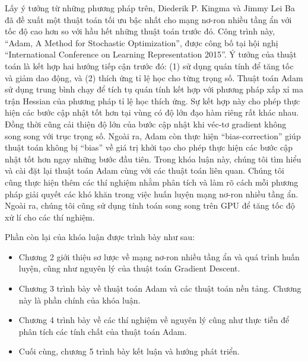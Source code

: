 Lấy ý tưởng từ những phương pháp trên, Diederik P. Kingma và Jimmy Lei Ba đã đề xuất một thuật toán tối ưu bậc nhất cho mạng nơ-ron nhiều tầng ẩn với tốc độ cao hơn so với hầu hết những thuật toán trước đó\cite{kingma2014adam}. Công trình này, ``Adam, A Method for Stochastic Optimization'', được công bố tại hội nghị ``International Conference on Learning Representation 2015''. Ý tưởng của thuật toán là kết hợp hai hướng tiếp cận trước đó: (1) sử dụng quán tính để tăng tốc và giảm dao động, và (2) thích ứng tỉ lệ học cho từng trọng số. Thuật toán Adam sử dụng trung bình chạy để tích tụ quán tính kết hợp với phương pháp xấp xỉ ma trận Hessian của phương pháp tỉ lệ học thích ứng. Sự kết hợp này cho phép thực hiện các bước cập nhật tốt hơn tại vùng có độ lớn đạo hàm riêng rất khác nhau. Đồng thời cũng cải thiện độ lớn của bước cập nhật khi véc-tơ gradient không song song với trục trọng số. Ngoài ra, Adam còn thực hiện ``bias-correction'' giúp thuật toán không bị ``bias'' về giá trị khởi tạo cho phép thực hiện các bước cập nhật tốt hơn ngay những bước đầu tiên. Trong khóa luận này, chúng tôi tìm hiểu và cài đặt lại thuật toán Adam cùng với các thuật toán liên quan. Chúng tôi cũng thực hiện thêm các thí nghiệm nhằm phân tích và làm rõ cách mỗi phương pháp giải quyết các khó khăn trong việc huấn luyện mạng nơ-ron nhiều tầng ẩn. Ngoài ra, chúng tôi cũng sử dụng tính toán song song trên GPU để tăng tốc độ xử lí cho các thí nghiệm.

Phần còn lại của khóa luận được trình bày như sau:

\begin{itemize}
	\item Chương 2 giới thiệu sơ lược về mạng nơ-ron nhiều tầng ẩn và quá trình huấn luyện, cũng như nguyên lý của thuật toán Gradient Descent.
	\item Chương 3 trình bày về thuật toán Adam và các thuật toán nền tảng. Chương này là phần chính của khóa luận.
	\item Chương 4 trình bày về các thí nghiệm về nguyên lý cũng như thực tiễn để phân tích các tính chất của thuật toán Adam.
	\item Cuối cùng, chương 5 trình bày kết luận và hướng phát triển.
\end{itemize}
